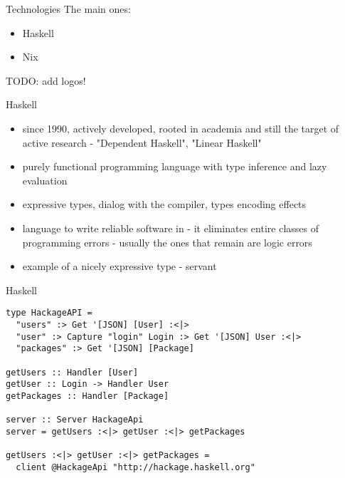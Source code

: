 \documentclass[presentation]{beamer}
\begin{document}
\begin{frame}[label={sec:org540f6c1}]{Technologies}
The main ones:
\begin{itemize}
\item Haskell
\item Nix
\end{itemize}

TODO: add logos!
\end{frame}

\begin{frame}[label={sec:orgce77b40}]{Haskell}
\begin{itemize}
\item since 1990, actively developed, rooted in academia and still the target of
active research - "Dependent Haskell", "Linear Haskell"
\item purely functional programming language with type inference and lazy evaluation
\item expressive types, dialog with the compiler, types encoding effects
\item language to write reliable software in - it eliminates entire classes of
programming errors - usually the ones that remain are logic errors
\item example of a nicely expressive type - servant
\end{itemize}
\end{frame}

\begin{frame}[fragile,label={sec:org90416f2}]{Haskell}
 \begin{verbatim}
type HackageAPI =
  "users" :> Get '[JSON] [User] :<|>
  "user" :> Capture "login" Login :> Get '[JSON] User :<|>
  "packages" :> Get '[JSON] [Package]

getUsers :: Handler [User]
getUser :: Login -> Handler User
getPackages :: Handler [Package]

server :: Server HackageApi
server = getUsers :<|> getUser :<|> getPackages

getUsers :<|> getUser :<|> getPackages =
  client @HackageApi "http://hackage.haskell.org"
\end{verbatim}
\end{frame}
\end{document}
